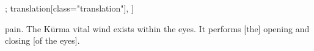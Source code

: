 \begin{alignment}[
  texts=edition[class="edition"];
  translation[class="translation"],
  ]
\begin{translation}
\begin{tlate}[p26_01]
pain. The Kūrma vital wind exists within the eyes. It performs [the] opening and closing [of the eyes].%
  \flushpage 
    \end{tlate}
  \end{translation}
\end{alignment}
\pagebreak %
